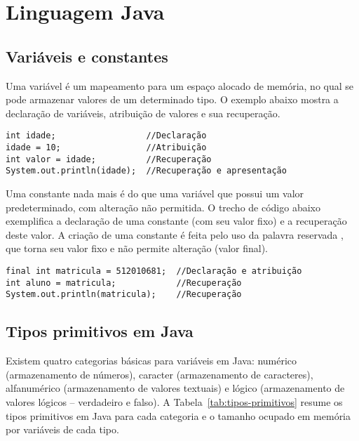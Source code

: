 \chapter{Linguagem Java}

\section{Variáveis e constantes}
Uma variável é um mapeamento para um espaço alocado de memória, no qual se pode armazenar valores de um determinado tipo. O exemplo abaixo mostra a declaração de variáveis, atribuição de valores e sua recuperação.

\begin{verbatim}
int idade;                  //Declaração
idade = 10;                 //Atribuição
int valor = idade;          //Recuperação
System.out.println(idade);  //Recuperação e apresentação
\end{verbatim}

Uma constante nada mais é do que uma variável que possui um valor predeterminado, com alteração não permitida. O trecho de código abaixo exemplifica a declaração de uma constante (com seu valor fixo) e a recuperação deste valor. A criação de uma constante é feita pelo uso da palavra reservada , que torna seu valor fixo e não permite alteração (valor final).

\begin{verbatim}
final int matricula = 512010681;  //Declaração e atribuição
int aluno = matricula;            //Recuperação
System.out.println(matricula);    //Recuperação
\end{verbatim}

\section{Tipos primitivos em Java}

Existem quatro categorias básicas para variáveis em Java: numérico (armazenamento de números), caracter (armazenamento de caracteres), alfanumérico (armazenamento de valores textuais) e lógico (armazenamento de valores lógicos -- verdadeiro e falso). A Tabela~\ref{tab:tipos-primitivos} resume os tipos primitivos em Java para cada categoria e o tamanho ocupado em memória por variáveis de cada tipo.

